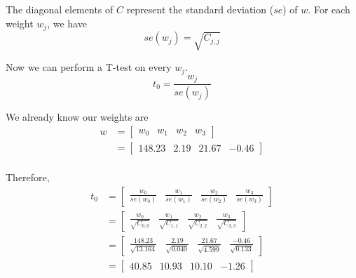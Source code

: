 \documentclass[
	letterpaper
]{article}
\begin{document}
The diagonal elements of $C$ represent the standard deviation ($se$) of $w$.
For each weight $w_j$, we have
\begin{equation}
se(w_j)= \sqrt{C_{j,j}}
\end{equation}

Now we can perform a T-test on every $w_j$.
\begin{equation}
t_0 = \frac{w_j}{se(w_j)}
\end{equation}

We already know our weights are 
\begin{equation}
\begin{split}
w &=\begin{bmatrix}
w_0 & w_1 & w_2 & w_3
\end{bmatrix}\\
&=\begin{bmatrix}
148.23 & 2.19& 21.67 & -0.46
\end{bmatrix}\\
\end{split}
\end{equation}

Therefore,
\begin{equation}
\begin{split}
t_0 &=\begin{bmatrix}
\frac{w_0}{se(w_0)} & \frac{w_1}{se(w_1)} & \frac{w_2}{se(w_2)} & \frac{w_3}{se(w_3)}
\end{bmatrix}\\
&=\begin{bmatrix}
\frac{w_0}{\sqrt{C_{0,0}}} & \frac{w_1}{\sqrt{C_{1,1}}} & \frac{w_2}{\sqrt{C_{2,2}}} & \frac{w_3}{\sqrt{C_{3,3}}}
\end{bmatrix}\\
&=\begin{bmatrix}
\frac{148.23}{\sqrt{13.164}} & \frac{2.19}{\sqrt{0.040}} & \frac{21.67}{\sqrt{4.599}} & \frac{-0.46}{\sqrt{0.133}}
\end{bmatrix}\\
&=\begin{bmatrix}
40.85 & 10.93& 10.10 & -1.26
\end{bmatrix}\\
\end{split}
\end{equation}
\end{document}
